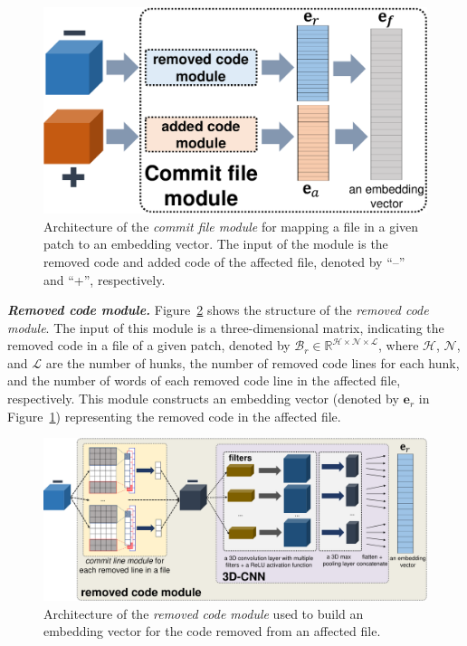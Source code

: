 \begin{figure}[t!]
	\center
	\includegraphics[scale=0.43]{figures/commit_file_model.pdf}
	\caption{Architecture of the \textit{commit file module} for
          mapping a file in a given patch to an embedding vector. The input
          of the module is the removed code and added code of the affected
          file, denoted by ``--'' and ``+'', respectively.}
	\label{fig:commit_code_model}
\end{figure}

\textbf{\textit{Removed code module.}} Figure~\ref{fig:cnn3d}
shows the structure of the \textit{removed code module}. The
input of this module is a three-dimensional matrix, indicating the removed code
in a file of a given patch, denoted by $\mathcal{B}_r \in
\mathbb{R}^{\mathcal{H} \times \mathcal{N} \times \mathcal{L}}$, where
$\mathcal{H}$, $\mathcal{N}$, and $\mathcal{L}$ are the number of hunks,
the number of removed code lines for each hunk, and the number of words of each
removed code line in the affected file, respectively. This module
constructs an embedding vector (denoted by $\textbf{e}_r$ in Figure~\ref{fig:commit_code_model}) representing the removed code in the affected file.

\begin{figure}[t!]
	\center
	\includegraphics[scale=0.38]{figures/cnn-3d_ver1.pdf}
	\caption{Architecture of the \textit{removed code module} used to build an embedding vector for the code removed from an affected file.}
	\label{fig:cnn3d}
\end{figure}

